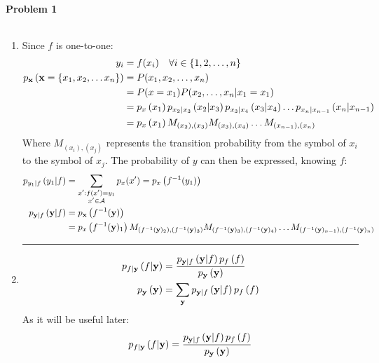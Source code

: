 \documentclass[12pt]{report}
\begin{document}
\maketitle

\paragraph{Problem 1}
$ $ \\
\begin{enumerate}[a]
	\item Since $f$ is one-to-one:
	\begin{align*}
	y_i &= f(x_i)\quad \forall i \in \left\lbrace 1, 2,\hdots, n \right\rbrace\\
	p_{{\mathbf{x}}}\left( \mathbf{x} = \left\lbrace x_1, x_2, \hdots x_n \right\rbrace \right) &= P(x_1, x_2, \hdots, x_n) \\
	&= P(x=x_1) P(x_2, \hdots, x_n \vert x_1 =x_1 )\\
	&=p_{{x}}\left( x_1 \right)p_{x_2\vert x_3}\left( x_2 \vert x_3 \right)p_{x_3\vert x_4}\left( x_3 \vert x_4 \right)\hdots p_{x_n\vert x_{n-1}}\left( x_n \vert x_{n-1} \right)\\
	&= p_{{x}}\left( x_1 \right) M_{(x_2),(x_3)}M_{(x_3),(x_4)}\hdots M_{(x_{n-1}),(x_n)}\\
	\end{align*}
	Where $M_{(x_i),(x_j)}$ represents the transition probability from the symbol of $x_i$ to the symbol of $x_j$. The probability of $y$ can then be expressed, knowing $f$:
	\begin{align*}
	p_{{y_1}\vert f}\left( y_1 \vert f \right)&=\sum_{ \substack{x': f(x') = y_1 \\ x' \in \mathcal{A} }} p_{x}(x')= p_{{x}}\left( f^{-1}(y_1) \right)\\
	p_{\mathbf{y}\vert f}\left( \mathbf{y} \vert f \right)&= p_{{\mathbf{x}}}\left( f^{-1}(\mathbf{y}) \right)\\
	&= p_{{x}}\left( f^{-1}(\mathbf{y})_1 \right) M_{(f^{-1}(\mathbf{y})_2),(f^{-1}(\mathbf{y})_3)}M_{(f^{-1}(\mathbf{y})_3),(f^{-1}(\mathbf{y})_4)}\hdots M_{(f^{-1}(\mathbf{y})_{n-1}),(f^{-1}(\mathbf{y})_n)}\\
	\end{align*}
\hrule
\item 
	\begin{align*}
	p_{f\vert \mathbf{y}}\left( f \vert \mathbf{y} \right)&=\frac{	p_{\mathbf{y}\vert f}\left( \mathbf{y} \vert f \right) p_{{f}}\left( f \right)}{p_{{\mathbf{y}}}\left( \mathbf{y} \right)}\\
	p_{{\mathbf{y}}}\left( \mathbf{y} \right) &= \sum_{\mathbf{y}}	p_{\mathbf{y}\vert f}\left( \mathbf{y} \vert f \right) p_{{f}}\left( f \right)
	\end{align*}
	As it will be useful later:
	\begin{align*}
\cprobd{f}{f}{\bdy}&=\frac{	\cprobd{\bdy}{\bdy}{f} \probd{f}{f}}{\probd{\bdy}{\bdy}}\\

\end{align*}
\end{enumerate}
\end{document}
